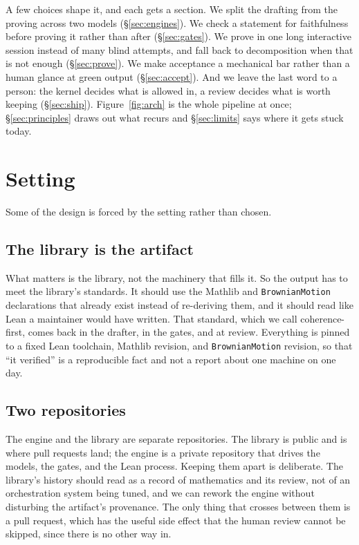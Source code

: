 \documentclass[11pt]{article}
\newcommand{\lean}[1]{\texttt{\def\_{\textunderscore\allowbreak}#1}}
\begin{document}
A few choices shape it, and each gets a section. We split the drafting from the proving
across two models (\S\ref{sec:engines}). We check a statement for faithfulness before
proving it rather than after (\S\ref{sec:gates}). We prove in one long interactive
session instead of many blind attempts, and fall back to decomposition when that is not
enough (\S\ref{sec:prove}). We make acceptance a mechanical bar rather than a human
glance at green output (\S\ref{sec:accept}). And we leave the last word to a person: the
kernel decides what is allowed in, a review decides what is worth keeping
(\S\ref{sec:ship}). Figure~\ref{fig:arch} is the whole pipeline at once;
\S\ref{sec:principles} draws out what recurs and \S\ref{sec:limits} says where it gets
stuck today.

\section{Setting}\label{sec:setting}

Some of the design is forced by the setting rather than chosen.

\subsection{The library is the artifact}
What matters is the library, not the machinery that fills it. So the output has to meet
the library's standards. It should use the Mathlib and \lean{BrownianMotion}
declarations that already exist instead of re-deriving them, and it should read like Lean
a maintainer would have written. That standard, which we call coherence-first, comes
back in the drafter, in the gates, and at review. Everything is pinned to a fixed Lean
toolchain, Mathlib revision, and \lean{BrownianMotion} revision, so that ``it verified''
is a reproducible fact and not a report about one machine on one day.

\subsection{Two repositories}
The engine and the library are separate repositories. The library is public and is where
pull requests land; the engine is a private repository that drives the models, the
gates, and the Lean process. Keeping them apart is deliberate. The library's history
should read as a record of mathematics and its review, not of an orchestration system
being tuned, and we can rework the engine without disturbing the artifact's provenance.
The only thing that crosses between them is a pull request, which has the useful side
effect that the human review cannot be skipped, since there is no other way in.
\end{document}
